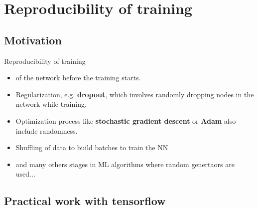 \documentclass[10pt,serif,mathserif,compress,hyperref={colorlinks}]{beamer}
\begin{document}
\section{Reproducibility of training}

\subsection{Motivation}

\begin{frame}{Reproducibility of training}
  
  \begin{tcolorbox}[title=Where to find randomness in NN training]
    
    \begin{itemize}
    \item<1->  of the network before the training starts.
    \item<2-> Regularization, e.g. {\bf dropout}, which involves randomly dropping nodes in the network while training.
    \item<3-> Optimization process like {\bf stochastic gradient descent} or {\bf Adam} also include randomness.
    \item<4-> Shuffling of data to build batches to train the NN
    \item<5-> and many others stages in ML algorithms  where random genertaors are used...
    \end{itemize}
  \end{tcolorbox}
    
\end{frame}
 
\subsection{Practical work with tensorflow}
\end{document}
